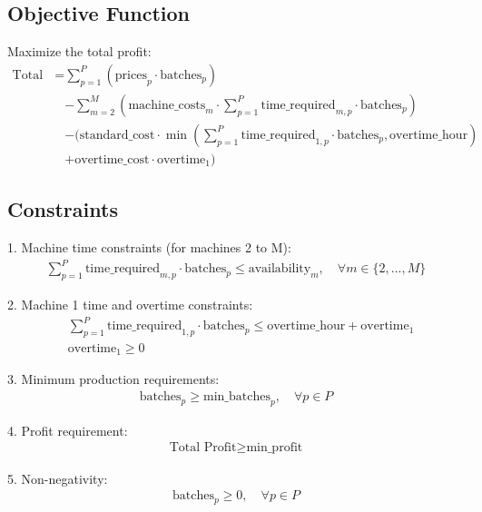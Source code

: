 \documentclass{article}
\begin{document}
\subsection*{Objective Function}
Maximize the total profit:
\begin{align*}
    \text{Total Profit} = & \sum_{p=1}^P \left( \text{prices}_p \cdot \text{batches}_p \right) \\
    & - \sum_{m=2}^M \left( \text{machine\_costs}_m \cdot \sum_{p=1}^P \text{time\_required}_{m,p} \cdot \text{batches}_p \right) \\
    & - (\text{standard\_cost} \cdot \min(\sum_{p=1}^P \text{time\_required}_{1,p} \cdot \text{batches}_p, \text{overtime\_hour}) \\
    & + \text{overtime\_cost} \cdot \text{overtime}_1 )
\end{align*}

\subsection*{Constraints}
1. Machine time constraints (for machines 2 to M):
\begin{align*}
    \sum_{p=1}^P \text{time\_required}_{m,p} \cdot \text{batches}_p \leq \text{availability}_m, \quad \forall m \in \{2, ..., M\}
\end{align*}

2. Machine 1 time and overtime constraints:
\begin{align*}
    & \sum_{p=1}^P \text{time\_required}_{1,p} \cdot \text{batches}_p \leq \text{overtime\_hour} + \text{overtime}_1 \\
    & \text{overtime}_1 \geq 0
\end{align*}

3. Minimum production requirements:
\begin{align*}
    \text{batches}_p \geq \text{min\_batches}_p, \quad \forall p \in P
\end{align*}

4. Profit requirement:
\begin{align*}
    \text{Total Profit} \geq \text{min\_profit}
\end{align*}

5. Non-negativity:
\begin{align*}
    \text{batches}_p \geq 0, \quad \forall p \in P
\end{align*}
\end{document}
